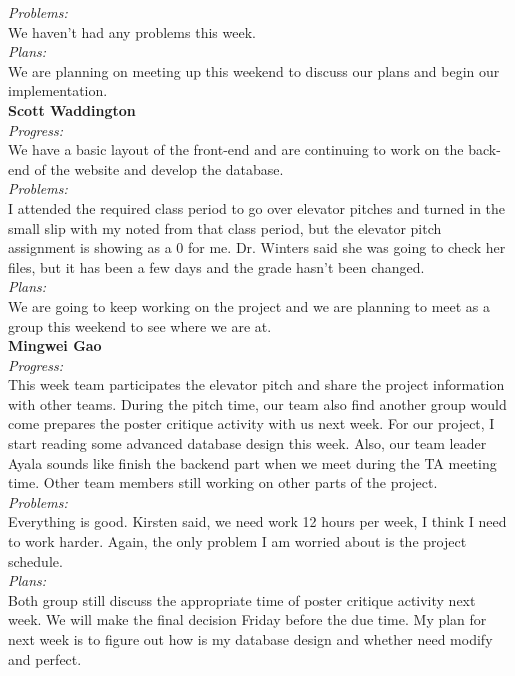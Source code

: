 \noindent\textit{Problems:}\\
\noindent We haven't had any problems this week.\\

\noindent\textit{Plans:}\\
\noindent We are planning on meeting up this weekend to discuss our plans and begin our implementation.\\

\noindent\textbf{Scott Waddington}\\
\noindent\textit{Progress:}\\
We have a basic layout of the front-end and are continuing to work on the back-end of the website and develop the database.\\

\noindent\textit{Problems:}\\
\noindent I attended the required class period to go over elevator pitches and turned in the small slip with my noted from that class period, but the elevator pitch assignment is showing as a 0 for me. Dr. Winters said she was going to check her files, but it has been a few days and the grade hasn't been changed.\\

\noindent\textit{Plans:}\\
\noindent We are going to keep working on the project and we are planning to meet as a group this weekend to see where we are at.\\

\noindent\textbf{Mingwei Gao}\\
\noindent\textit{Progress:}\\
This week team participates the elevator pitch and share the project information with other teams. During the pitch time, our team also find another group would come prepares the poster critique activity with us next week. For our project, I start reading some advanced database design this week. Also, our team leader Ayala sounds like finish the backend part when we meet during the TA meeting time. Other team members still working on other parts of the project.\\

\noindent\textit{Problems:}\\
\noindent Everything is good. Kirsten said, we need work 12 hours per week, I think I need to work harder. Again, the only problem I am worried about is the project schedule. \\

\noindent\textit{Plans:}\\
\noindent Both group still discuss the appropriate time of poster critique activity next week. We will make the final decision Friday before the due time. My plan for next week is to figure out how is my database design and whether need modify and perfect.\\

